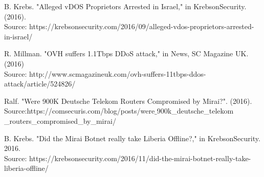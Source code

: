 \documentclass[conference]{IEEEtran}
\begin{document}
\begin{thebibliography}{00}
B. Krebs. "Alleged vDOS Proprietors Arrested
in Israel," in KrebsonSecurity. (2016). \\Source:
https://krebsonsecurity.com/2016/09/alleged-vdos-proprietors-arrested-in-israel/


R. Millman. "OVH suffers 1.1Tbps DDoS attack,"
in News, SC Magazine UK. (2016) \\Source:
http://www.scmagazineuk.com/ovh-suffers-11tbps-ddos-attack/article/524826/ 

Ralf. "Were 900K Deutsche Telekom Routers Compromised
by Mirai?". (2016). \\Source:https://comsecuris.com/blog/posts/were$\_$900k\_deutsche\_telekom
\_routers\_compromised\_by\_mirai/

B. Krebs. "Did the Mirai Botnet really take
Liberia Offline?," in KrebsonSecurity. 2016. \\Source:
https://krebsonsecurity.com/2016/11/did-the-mirai-botnet-really-take-liberia-offline/ 
\end{thebibliography}
\vspace{12pt}
\end{document}
